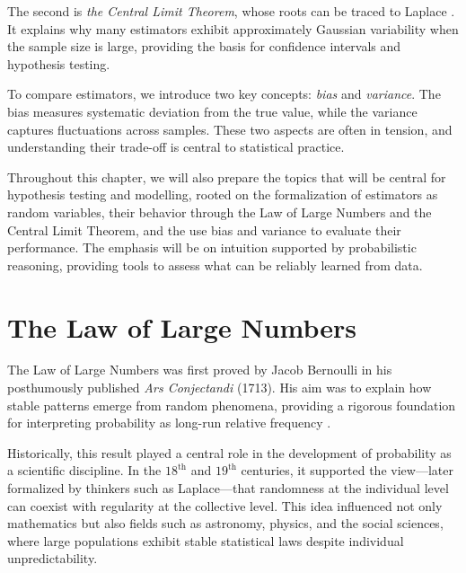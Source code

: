 \medskip

The second is \textit{the Central Limit Theorem}, whose roots can be traced to Laplace \cite{laplace_1812_theorie}. It explains why many estimators exhibit approximately Gaussian variability when the sample size is large, providing the basis for confidence intervals and hypothesis testing.

\medskip

To compare estimators, we introduce two key concepts: \textit{bias} and \textit{variance}. The bias measures systematic deviation from the true value, while the variance captures fluctuations across samples. These two aspects are often in tension, and understanding their trade-off is central to statistical practice.

\medskip

Throughout this chapter, we will also prepare the topics that will be central for hypothesis testing and modelling, rooted on the formalization of estimators as random variables, their behavior through the Law of Large Numbers and the Central Limit Theorem, and the use bias and variance to evaluate their performance. The emphasis will be on intuition supported by probabilistic reasoning, providing tools to assess what can be reliably learned from data.

\section{The Law of Large Numbers}

The Law of Large Numbers was first proved by Jacob Bernoulli in his posthumously published \textit{Ars Conjectandi} (1713). His aim was to explain how stable patterns emerge from random phenomena, providing a rigorous foundation for interpreting probability as long-run relative frequency \cite{bernoulli_1713_ars, hald_1990_history}.

\medskip

Historically, this result played a central role in the development of probability as a scientific discipline. In the $18^{\text{th}}$ and $19^{\text{th}}$ centuries, it supported the view—later formalized by thinkers such as Laplace—that randomness at the individual level can coexist with regularity at the collective level. This idea influenced not only mathematics but also fields such as astronomy, physics, and the social sciences, where large populations exhibit stable statistical laws despite individual unpredictability.

